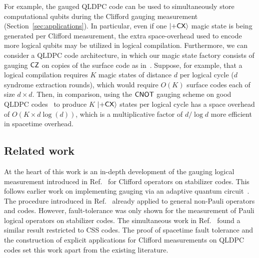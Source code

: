 \documentclass[11pt]{article}
\begin{document}
For example, the gauged QLDPC code can be used to simultaneously store computational qubits during the Clifford gauging measurement (Section~\ref{sec:applications}). In particular, even if one $\ket{+\mathsf{CX}}$ magic state is being generated per Clifford measurement, the extra space-overhead used to encode more logical qubits may be utilized in logical compilation. 
Furthermore, we can consider a QLDPC code architecture, in which our magic state factory consists of gauging $\mathsf{CZ}$ on copies of the surface code as in~\cite{brown2020fault,delafuente2026highthresholddecodingnonpaulicodes}. 
Suppose, for example, that a logical compilation requires $K$ magic states of distance $d$ per logical cycle ($d$ syndrome extraction rounds), which would require $O(K)$ surface codes each of size $d\times d$.
Then, in comparison, using the $\mathsf{CNOT}$ gauging scheme on good QLDPC codes~\cite{panteleev2022asymptotically,leverrier2022quantum,dinur2022goodquantumldpccodes} to produce $K$ $\ket{+\mathsf{CX}}$ states per logical cycle has a space overhead of $O(K\times d\log(d))$, which is a multiplicative factor of $d/\log d$ more efficient in spacetime overhead. 




\subsection{Related work}




At the heart of this work is an in-depth development of the gauging logical measurement introduced in Ref.~\cite{williamson2024lowoverheadfaulttolerantquantumcomputation} for Clifford operators on stabilizer codes. This follows earlier work on implementing gauging via an adaptive quantum circuit~\cite{Williamson_2021,Tantivasadakarn_2024,Tantivasadakarn_2023}. The procedure introduced in Ref.~\cite{williamson2024lowoverheadfaulttolerantquantumcomputation} already applied to general non-Pauli operators and codes. However, fault-tolerance was only shown for the measurement of Pauli logical operators on stabilizer codes. The simultaneous work in Ref.~\cite{Ide_2025} found a similar result restricted to CSS codes. 
The proof of spacetime fault tolerance and the construction of explicit applications for Clifford measurements on QLDPC codes set this work apart from the existing literature. 
\end{document}
